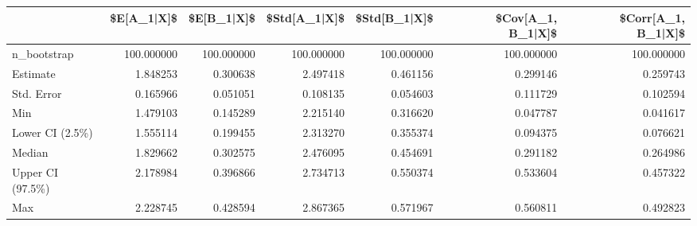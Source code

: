 \begin{tabular}{lrrrrrr}
\toprule
{} &  \$E[A\_1|X]\$ &  \$E[B\_1|X]\$ &  \$Std[A\_1|X]\$ &  \$Std[B\_1|X]\$ &  \$Cov[A\_1, B\_1|X]\$ &  \$Corr[A\_1, B\_1|X]\$ \\
\midrule
n\_bootstrap      &  100.000000 &  100.000000 &    100.000000 &    100.000000 &         100.000000 &          100.000000 \\
Estimate         &    1.848253 &    0.300638 &      2.497418 &      0.461156 &           0.299146 &            0.259743 \\
Std. Error       &    0.165966 &    0.051051 &      0.108135 &      0.054603 &           0.111729 &            0.102594 \\
Min              &    1.479103 &    0.145289 &      2.215140 &      0.316620 &           0.047787 &            0.041617 \\
Lower CI (2.5\%)  &    1.555114 &    0.199455 &      2.313270 &      0.355374 &           0.094375 &            0.076621 \\
Median           &    1.829662 &    0.302575 &      2.476095 &      0.454691 &           0.291182 &            0.264986 \\
Upper CI (97.5\%) &    2.178984 &    0.396866 &      2.734713 &      0.550374 &           0.533604 &            0.457322 \\
Max              &    2.228745 &    0.428594 &      2.867365 &      0.571967 &           0.560811 &            0.492823 \\
\bottomrule
\end{tabular}
